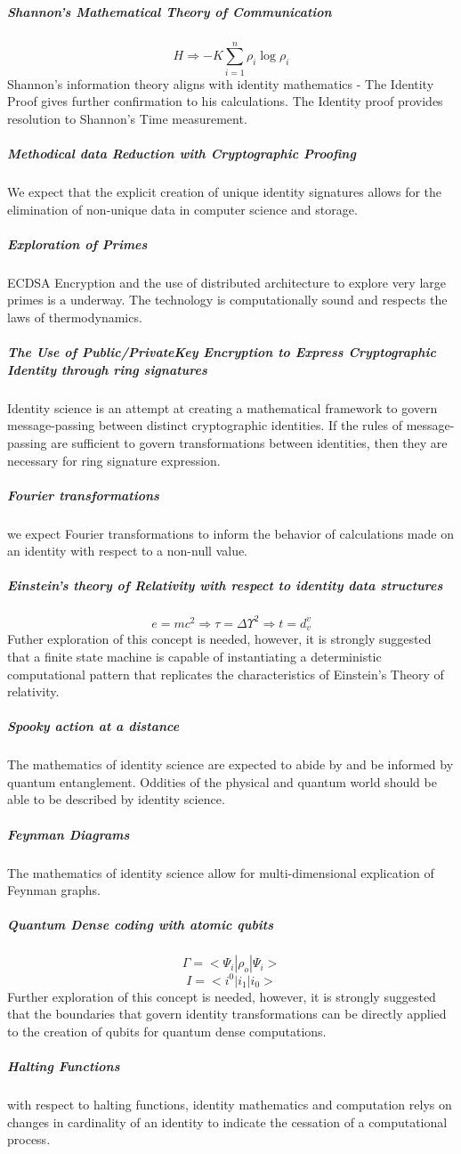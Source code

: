\documentclass{article}
\begin{document}
			\subparagraph{Shannon's Mathematical Theory of Communication}
				\begin{equation}
					H \Rightarrow -K \sum_{i=1}^{n} \rho_i \log \rho_i 
				\end{equation}
				Shannon's information theory aligns with identity mathematics - The Identity Proof gives further confirmation to his calculations.  The Identity proof provides resolution to Shannon's Time measurement.
			\subparagraph{Methodical data Reduction with Cryptographic Proofing} We expect that the explicit creation of unique identity signatures allows for the elimination of non-unique data in computer science and storage.
			\subparagraph{Exploration of Primes} ECDSA Encryption and the use of distributed architecture to explore very large primes is a underway.  The technology is computationally sound and respects the laws of thermodynamics.
			\subparagraph{The Use of Public/PrivateKey Encryption to Express Cryptographic Identity through ring signatures}  Identity science is an attempt at creating a mathematical framework to govern message-passing between distinct cryptographic identities. If the rules of message-passing are sufficient to govern transformations between identities, then they are necessary for ring signature expression.
			\subparagraph{Fourier transformations} we expect Fourier transformations to inform the behavior of calculations made on an identity with respect to a non-null value.
			\subparagraph{Einstein's theory of Relativity with respect to identity data structures}
				\begin{equation}
				e=mc^2 \Rightarrow \tau=\Delta \Upsilon^2 \Rightarrow t= d^v_v
				\end{equation}
				Futher exploration of this concept is needed, however, it is strongly suggested that a finite state machine is capable of instantiating a deterministic computational pattern that replicates the characteristics of Einstein's Theory of relativity.
			\subparagraph{Spooky action at a distance}
				The mathematics of identity science are expected to abide by and be informed by quantum entanglement.  Oddities of the physical and quantum world should be able to be described by identity science.
			\subparagraph{Feynman Diagrams}
				The mathematics of identity science allow for multi-dimensional explication of Feynman graphs.
			\subparagraph{Quantum Dense coding with atomic qubits}
				\begin{equation}
					\Gamma = < \Psi_i | \rho_o | \Psi_i >
				\end{equation}
				\begin{equation}
					I = < i^0 | i_1 | i_0 >
				\end{equation}
				Further exploration of this concept is needed, however, it is strongly suggested that the boundaries that govern identity transformations can be directly applied to the creation of qubits for quantum dense computations.
			\subparagraph{Halting Functions}
				with respect to halting functions, identity mathematics and computation relys on changes in cardinality of an identity to indicate the cessation of a computational process.
\end{document}
